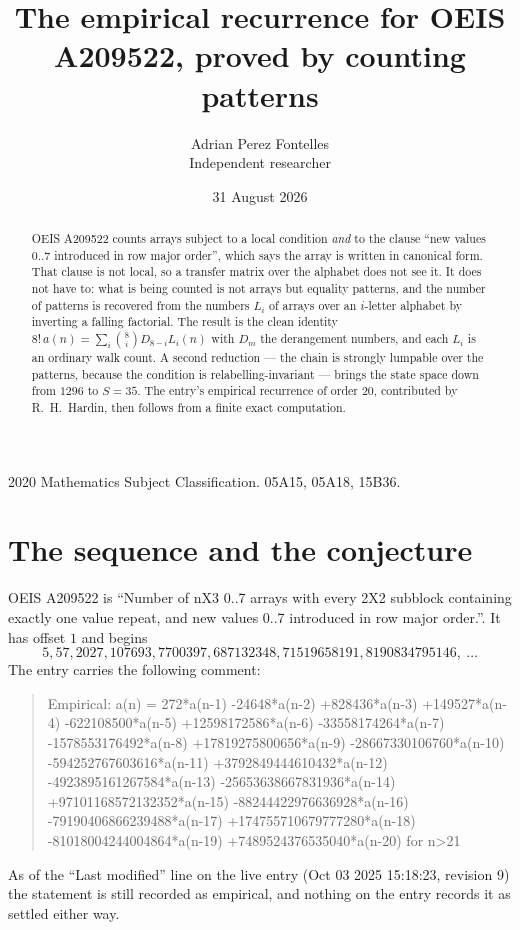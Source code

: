 \documentclass[11pt,a4paper]{article}
\title{The empirical recurrence for OEIS A209522, proved by counting patterns}
\author{Adrian Perez Fontelles\\ \small Independent researcher}
\date{31 August 2026}
\theoremstyle{plain}
\theoremstyle{definition}
\begin{document}
\maketitle

\begin{abstract}
OEIS A209522 counts arrays subject to a local condition \emph{and} to the clause ``new values
$0..7$ introduced in row major order'', which says the array is written in canonical
form. That clause is not local, so a transfer matrix over the alphabet does not see it. It
does not have to: what is being counted is not arrays but equality patterns, and the number
of patterns is recovered from the numbers $L_i$ of arrays over an $i$-letter alphabet by
inverting a falling factorial. The result is the clean identity
$8!\,a(n)=\sum_i\binom{8}{i}D_{8-i}L_i(n)$ with $D_m$ the derangement numbers,
and each $L_i$ is an ordinary walk count. A second reduction --- the chain is strongly
lumpable over the patterns, because the condition is relabelling-invariant --- brings the
state space down from $1296$ to $S=35$. The entry's empirical recurrence of order
$20$, contributed by R.~H.~Hardin, then follows from a finite exact computation.
\end{abstract}

\noindent\small 2020 Mathematics Subject Classification. 05A15, 05A18, 15B36.\normalsize

\section{The sequence and the conjecture}

OEIS A209522 is ``Number of nX3 0..7 arrays with every 2X2 subblock containing exactly one value repeat, and new values 0..7 introduced in row major order.''. It has offset $1$ and begins
\[
5, 57, 2027, 107693, 7700397, 687132348, 71519658191, 8190834795146,\ \dots
\]
The entry carries the following comment:
\begin{quote}\small
Empirical: a(n) = 272*a(n-1) -24648*a(n-2) +828436*a(n-3) +149527*a(n-4) -622108500*a(n-5) +12598172586*a(n-6) -33558174264*a(n-7) -1578553176492*a(n-8) +17819275800656*a(n-9) -28667330106760*a(n-10) -594252767603616*a(n-11) +3792849444610432*a(n-12) -4923895161267584*a(n-13) -25653638667831936*a(n-14) +97101168572132352*a(n-15) -88244422976636928*a(n-16) -79190406866239488*a(n-17) +174755710679777280*a(n-18) -81018004244004864*a(n-19) +7489524376535040*a(n-20) for n>21
\end{quote}
As of the ``Last modified'' line on the live entry (Oct 03 2025 15:18:23, revision 9) the statement is
still recorded as empirical, and nothing on the entry records it as settled either way.
\end{document}
